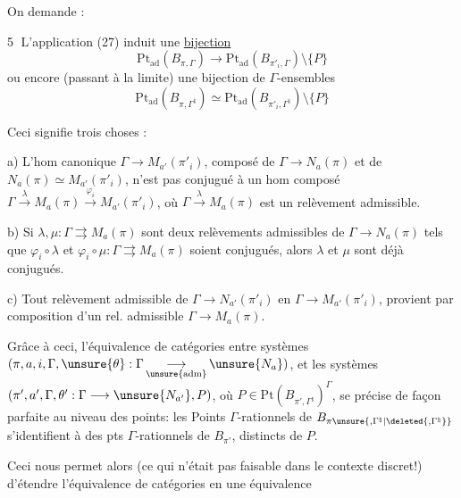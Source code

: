 On demande :

\textcircled{5} L'application (27) induit une \uline{bijection}
\[
\mathrm{Pt}_{\mathrm{ad}}(B_{\pi,\Gamma})
\longrightarrow
\mathrm{Pt}_{\mathrm{ad}}(B_{\pi'_i,\Gamma})\setminus\{P\}
\]
ou encore (passant à la limite) une bijection de $\Gamma$-ensembles
\[
\mathrm{Pt}_{\mathrm{ad}}(B_{\pi,\Gamma^{\natural}})
\simeq
\mathrm{Pt}_{\mathrm{ad}}(B_{\pi'_i,\Gamma^{\natural}})\setminus\{P\}
\]

Ceci signifie trois choses :

a) L'hom canonique $\Gamma\longrightarrow M_{a'}(\pi'_i)$,
composé de $\Gamma\longrightarrow N_a(\pi)$ et de
$N_a(\pi)\simeq M_{a'}(\pi'_i)$,
n'est pas conjugué à un hom composé
$\Gamma\xrightarrow{\lambda}M_a(\pi)
\xrightarrow{\varphi_i}M_{a'}(\pi'_i)$,
où $\Gamma\xrightarrow{\lambda}M_a(\pi)$ est un relèvement admissible.

b) Si $\lambda,\mu:\Gamma\rightrightarrows M_a(\pi)$ sont deux
relèvements admissibles de $\Gamma\longrightarrow N_a(\pi)$
 tels que
$\varphi_i\circ\lambda$ et $\varphi_i\circ\mu:
\Gamma\rightrightarrows M_a(\pi)$ soient
conjugués, alors $\lambda$ et $\mu$ sont déjà
\inserted{$\pi$-}conjugués.

c) Tout relèvement admissible de
$\Gamma\longrightarrow N_{a'}(\pi'_i)$ en
$\Gamma\longrightarrow M_{a'}(\pi'_i)$,
provient par composition d'un rel. admissible
$\Gamma\longrightarrow M_a(\pi)$.

Grâce à ceci, l'équivalence de catégories entre systèmes
$(\pi,a,i,\Gamma,\unsure{\theta}:\Gamma\mathop{\longrightarrow}\limits_{\unsure{\mathrm{adm}}}\unsure{N_a})$,
et les systèmes $(\pi',a',\Gamma,\theta':\Gamma\longrightarrow\unsure{N_{a'}},P)$,
où $P\in\mathrm{Pt}(B_{\pi',\Gamma^{\natural}})^\Gamma$,
se précise de façon parfaite au niveau des points: les
Points $\Gamma$-rationnels de $B_{\pi\unsure{,\Gamma^{\natural}|\deleted{,\Gamma^{\natural}}}}$
s'identifient à 
 des pts $\Gamma$-rationnels
de $B_{\pi'}$, distincts de $P$.

Ceci nous permet alors (ce qui n'était pas faisable dans le contexte
discret!) d'étendre l'équivalence de catégories en une équivalence

